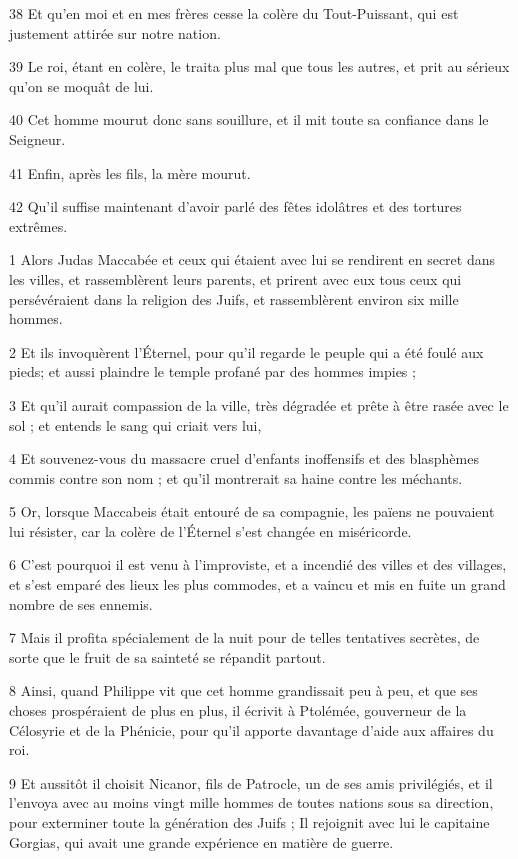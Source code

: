 \par 38 Et qu'en moi et en mes frères cesse la colère du Tout-Puissant, qui est justement attirée sur notre nation.
\par 39 Le roi, étant en colère, le traita plus mal que tous les autres, et prit au sérieux qu'on se moquât de lui.
\par 40 Cet homme mourut donc sans souillure, et il mit toute sa confiance dans le Seigneur.
\par 41 Enfin, après les fils, la mère mourut.
\par 42 Qu'il suffise maintenant d'avoir parlé des fêtes idolâtres et des tortures extrêmes.


\par 1 Alors Judas Maccabée et ceux qui étaient avec lui se rendirent en secret dans les villes, et rassemblèrent leurs parents, et prirent avec eux tous ceux qui persévéraient dans la religion des Juifs, et rassemblèrent environ six mille hommes.
\par 2 Et ils invoquèrent l'Éternel, pour qu'il regarde le peuple qui a été foulé aux pieds; et aussi plaindre le temple profané par des hommes impies ;
\par 3 Et qu'il aurait compassion de la ville, très dégradée et prête à être rasée avec le sol ; et entends le sang qui criait vers lui,
\par 4 Et souvenez-vous du massacre cruel d'enfants inoffensifs et des blasphèmes commis contre son nom ; et qu'il montrerait sa haine contre les méchants.
\par 5 Or, lorsque Maccabeis était entouré de sa compagnie, les païens ne pouvaient lui résister, car la colère de l'Éternel s'est changée en miséricorde.
\par 6 C'est pourquoi il est venu à l'improviste, et a incendié des villes et des villages, et s'est emparé des lieux les plus commodes, et a vaincu et mis en fuite un grand nombre de ses ennemis.
\par 7 Mais il profita spécialement de la nuit pour de telles tentatives secrètes, de sorte que le fruit de sa sainteté se répandit partout.
\par 8 Ainsi, quand Philippe vit que cet homme grandissait peu à peu, et que ses choses prospéraient de plus en plus, il écrivit à Ptolémée, gouverneur de la Célosyrie et de la Phénicie, pour qu'il apporte davantage d'aide aux affaires du roi.
\par 9 Et aussitôt il choisit Nicanor, fils de Patrocle, un de ses amis privilégiés, et il l'envoya avec au moins vingt mille hommes de toutes nations sous sa direction, pour exterminer toute la génération des Juifs ; Il rejoignit avec lui le capitaine Gorgias, qui avait une grande expérience en matière de guerre.
